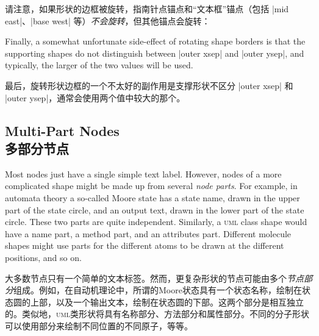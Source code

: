 请注意，如果形状的边框被旋转，指南针点锚点和“文本框”锚点（包括 |mid east|、|base west| 等）\emph{不会旋转}，但其他锚点会旋转：

\begin{codeexample}[preamble={\usetikzlibrary{shapes.geometric}}]
\end{codeexample}

Finally, a somewhat unfortunate side-effect of rotating shape borders is that
the supporting shapes do not distinguish between |outer xsep| and |outer ysep|,
and typically, the larger of the two values will be used.

最后，旋转形状边框的一个不太好的副作用是支撑形状不区分 |outer xsep| 和 |outer ysep|，通常会使用两个值中较大的那个。

\subsection{Multi-Part Nodes\\多部分节点}
\label{section-nodes-multi}

Most nodes just have a single simple text label. However, nodes of a more
complicated shape might be made up from several \emph{node parts}. For example,
in automata theory a so-called Moore state has a state name, drawn in the upper
part of the state circle, and an output text, drawn in the lower part of the
state circle. These two parts are quite independent. Similarly, a \textsc{uml}
class shape would have a name part, a method part, and an attributes part.
Different molecule shapes might use parts for the different atoms to be drawn
at the different positions, and so on.

大多数节点只有一个简单的文本标签。然而，更复杂形状的节点可能由多个\emph{节点部分}组成。例如，在自动机理论中，所谓的Moore状态具有一个状态名称，绘制在状态圆的上部，以及一个输出文本，绘制在状态圆的下部。这两个部分是相互独立的。类似地，\textsc{uml}类形状将具有名称部分、方法部分和属性部分。不同的分子形状可以使用部分来绘制不同位置的不同原子，等等。

